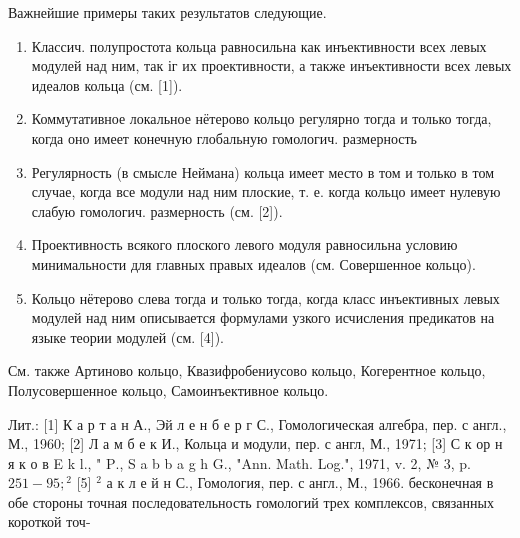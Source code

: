 \documentclass[10pt]{article}
\begin{document}
Важнейшие примеры таких результатов следующие.



\begin{enumerate}

  \item Классич. полупростота кольца равносильна как инъективности всех левых модулей над ним, так іг их проективности, а также инъективности всех левых идеалов кольца (см. [1]).



  \item Коммутативное локальное нётерово кольцо регулярно тогда и только тогда, когда оно имеет конечную глобальную гомологич. размерность



  \item Регулярность (в смысле Неймана) кольца имеет место в том и только в том случае, когда все модули над ним плоские, т. е. когда кольцо имеет нулевую слабую гомологич. размерность (см. [2]).



  \item Проективность всякого плоского левого модуля равносильна условию минимальности для главных правых идеалов (см. Совершенное кольцо).



  \item Кольцо нётерово слева тогда и только тогда, когда класс инъективных левых модулей над ним описывается формулами узкого исчисления предикатов на языке теории модулей (см. [4]).



\end{enumerate}



См. также Артиново кольцо, Квазифробениусово кольцо, Когерентное кольцо, Полусовершенное кольцо, Самоинъективное кольцо.



Лит.: [1] К а р т а н А., Эй л е н б е р г С., Гомологическая алгебра, пер. с англ., М., 1960; [2] Л а м б е к И., Кольца и модули, пер. с англ, М., 1971; [3] С к ор н я к о в E k l., " $\mathrm{P}$., S a b b a g h G., "Ann. Math. Log.", 1971, v. 2, № 3, p. $251-95 ;{ }^{2}$ [5] ${ }^{2}$ а к л е й н С., Гомология, пер. с англ., М., 1966. бесконечная в обе стороны точная последовательность гомологий трех комплексов, связанных короткой точ-
\end{document}
